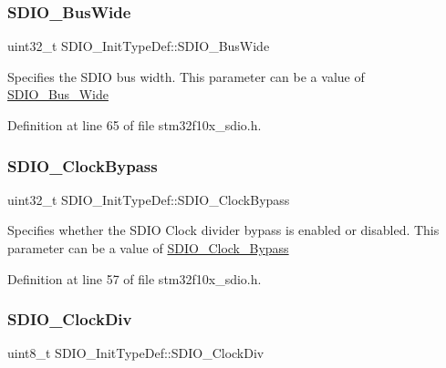 \subsubsection{\texorpdfstring{S\+D\+I\+O\+\_\+\+Bus\+Wide}{SDIO\_BusWide}}
{\footnotesize\ttfamily uint32\+\_\+t S\+D\+I\+O\+\_\+\+Init\+Type\+Def\+::\+S\+D\+I\+O\+\_\+\+Bus\+Wide}

Specifies the S\+D\+IO bus width. This parameter can be a value of \hyperlink{group___s_d_i_o___bus___wide}{S\+D\+I\+O\+\_\+\+Bus\+\_\+\+Wide} 

Definition at line 65 of file stm32f10x\+\_\+sdio.\+h.

\mbox{\label{struct_s_d_i_o___init_type_def_a6a06a65a5630b21da261f46125cb20b1}} 
\subsubsection{\texorpdfstring{S\+D\+I\+O\+\_\+\+Clock\+Bypass}{SDIO\_ClockBypass}}
{\footnotesize\ttfamily uint32\+\_\+t S\+D\+I\+O\+\_\+\+Init\+Type\+Def\+::\+S\+D\+I\+O\+\_\+\+Clock\+Bypass}

Specifies whether the S\+D\+IO Clock divider bypass is enabled or disabled. This parameter can be a value of \hyperlink{group___s_d_i_o___clock___bypass}{S\+D\+I\+O\+\_\+\+Clock\+\_\+\+Bypass} 

Definition at line 57 of file stm32f10x\+\_\+sdio.\+h.

\mbox{\label{struct_s_d_i_o___init_type_def_a4166ee534e6cf8ac2c6a6a03bec45b06}} 
\subsubsection{\texorpdfstring{S\+D\+I\+O\+\_\+\+Clock\+Div}{SDIO\_ClockDiv}}
{\footnotesize\ttfamily uint8\+\_\+t S\+D\+I\+O\+\_\+\+Init\+Type\+Def\+::\+S\+D\+I\+O\+\_\+\+Clock\+Div}

